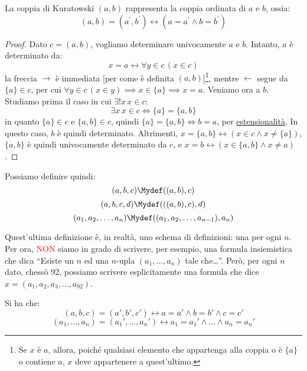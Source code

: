 \documentclass[11pt]{scrartcl}
\begin{document}
\begin{proposition}
	La coppia di Kuratowski $(a,b)$ rappresenta la coppia ordinata di $a$ e $b$, ossia:
	\[ (a,b) = (a^{\prime},b^{\prime}) \leftrightarrow (a = a^{\prime} \land b = b^{\prime})
		\]
\end{proposition}

\begin{proof}
	Dato $c = (a,b)$, vogliamo determinare univocamente $a$ e $b$. Intanto, $a$ è determinato da:
	\[ x = a \leftrightarrow \forall y \in c \,(x \in c)
		\]
	la freccia $\rightarrow$ è immediata [per come è definita $(a,b)$]\footnote{Se $x$ è $a$, allora,
	poiché qualsiasi elemento che appartenga alla coppia o è $\{a\}$ o contiene $a$, $x$ deve appartenere a quest'ultimo.},
	mentre $\leftarrow$ segue da $\{a\} \in c$, per cui $\forall y \in c \, (x \in y) \implies x \in \{a\} \implies x = a$.
	Veniamo ora a $b$. Studiamo prima il caso in cui $\exists ! x \, x \in c$:
	\[ \exists x \, x \in c \iff \{a\} = \{a,b\}
		\]
	in quanto $\{a\} \in c$ e $\{a,b\} \in c$, quindi $\{a\} = \{a,b\} \iff b = a$, per \hyperref[ax2]{estensionalità}. In questo caso, $b$ è quindi determinato.
	Altrimenti, $x = \{a,b\} \leftrightarrow (x \in c \land x \ne \{a\})$, $\{a,b\}$ è quindi univocamente determinato da $c$, e $x = b \leftrightarrow (x \in \{a,b\} \land x \ne a)$.
\end{proof}

\begin{definition}
	Possiamo definire quindi:
	\[ (a,b,c) \Mydef ((a,b),c)
		\]\[ (a,b,c,d) \Mydef (((a,b),c),d)
			\]\[ (a_1,a_2,\ldots,a_n) \Mydef ((a_1,a_2,\ldots,a_{n-1}),a_n)
				\]
\end{definition}

\begin{note}
	Quest'ultima definizione è, in realtà, uno schema di definizioni: una per ogni $n$. Per ora, \textcolor{red}{NON} siamo in grado di scrivere, per esempio,
	una formula insiemistica che dica ``Esiste un $n$ ed una $n$-upla $(a_1,\ldots,a_n)$ tale che…''. Però, per ogni $n$ dato, chessò 92, possiamo scrivere esplicitamente una formula che dice $x = (a_1,a_2,a_3,\ldots,a_{92})$.
\end{note}

\begin{proposition}
	Si ha che:
	\[ (a,b,c) = (a',b',c') \leftrightarrow a = a' \land b = b' \land c = c'
		\]\[ (a_1,\ldots,a_n) = (a_1',\ldots,a_n') \leftrightarrow a_1 = a_1' \land \ldots \land a_n = a_n'
			\]
\end{proposition}
\end{document}
